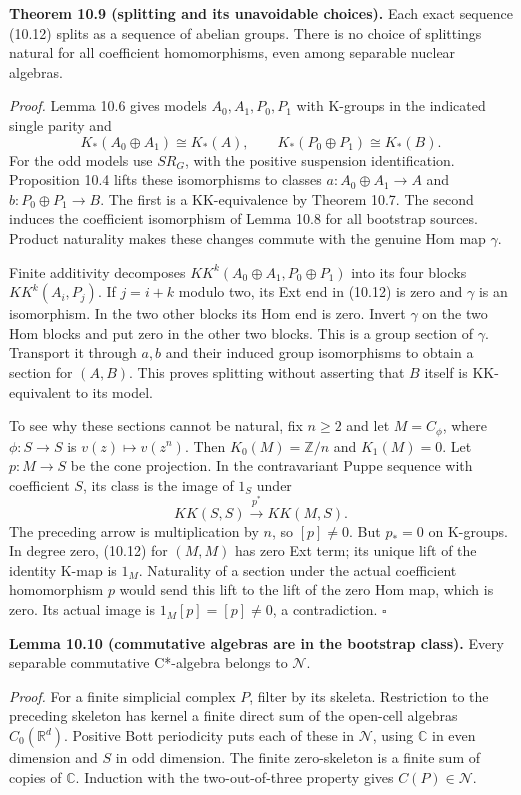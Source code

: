 \documentclass[
  11pt,
]{article}
\begin{document}
\textbf{Theorem 10.9 (splitting and its unavoidable choices).} Each
exact sequence (10.12) splits as a sequence of abelian groups. There is
no choice of splittings natural for all coefficient homomorphisms, even
among separable nuclear algebras.

\emph{Proof.} Lemma 10.6 gives models \(A_0,A_1,P_0,P_1\) with K-groups
in the indicated single parity and \[
K_*(A_0\oplus A_1)\cong K_*(A),\qquad
K_*(P_0\oplus P_1)\cong K_*(B).
\tag{10.18}
\] For the odd models use \(SR_G\), with the positive suspension
identification. Proposition 10.4 lifts these isomorphisms to classes
\(a:A_0\oplus A_1\to A\) and \(b:P_0\oplus P_1\to B\). The first is a
KK-equivalence by Theorem 10.7. The second induces the coefficient
isomorphism of Lemma 10.8 for all bootstrap sources. Product naturality
makes these changes commute with the genuine Hom map \(\gamma\).

Finite additivity decomposes \(KK^k(A_0\oplus A_1,P_0\oplus P_1)\) into
its four blocks \(KK^k(A_i,P_j)\). If \(j=i+k\) modulo two, its Ext end
in (10.12) is zero and \(\gamma\) is an isomorphism. In the two other
blocks its Hom end is zero. Invert \(\gamma\) on the two Hom blocks and
put zero in the other two blocks. This is a group section of \(\gamma\).
Transport it through \(a,b\) and their induced group isomorphisms to
obtain a section for \((A,B)\). This proves splitting without asserting
that \(B\) itself is KK-equivalent to its model.

To see why these sections cannot be natural, fix \(n\ge2\) and let
\(M=C_\phi\), where \(\phi:S\to S\) is \(v(z)\mapsto v(z^n)\). Then
\(K_0(M)=\mathbb Z/n\) and \(K_1(M)=0\). Let \(p:M\to S\) be the cone
projection. In the contravariant Puppe sequence with coefficient \(S\),
its class is the image of \(1_S\) under \[
KK(S,S)\xrightarrow{p^*}KK(M,S).
\tag{10.19}
\] The preceding arrow is multiplication by \(n\), so \([p]\ne0\). But
\(p_*=0\) on K-groups. In degree zero, (10.12) for \((M,M)\) has zero
Ext term; its unique lift of the identity K-map is \(1_M\). Naturality
of a section under the actual coefficient homomorphism \(p\) would send
this lift to the lift of the zero Hom map, which is zero. Its actual
image is \(1_M[p]=[p]\ne0\), a contradiction. \(\square\)

\textbf{Lemma 10.10 (commutative algebras are in the bootstrap class).}
Every separable commutative C*-algebra belongs to \(\mathcal N\).

\emph{Proof.} For a finite simplicial complex \(P\), filter by its
skeleta. Restriction to the preceding skeleton has kernel a finite
direct sum of the open-cell algebras \(C_0(\mathbb R^d)\). Positive Bott
periodicity puts each of these in \(\mathcal N\), using \(\mathbb C\) in
even dimension and \(S\) in odd dimension. The finite zero-skeleton is a
finite sum of copies of \(\mathbb C\). Induction with the
two-out-of-three property gives \(C(P)\in\mathcal N\).
\end{document}
